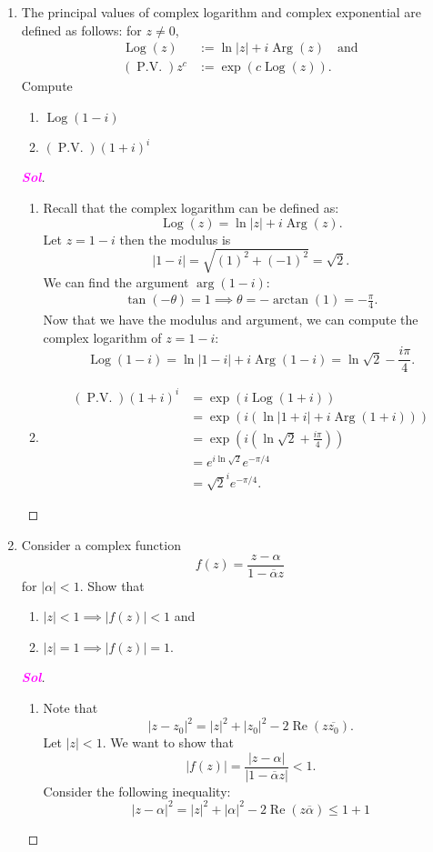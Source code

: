 \documentclass{article}
\theoremstyle{definition}
\newcommand{\Log}{\operatorname{Log}}
\newcommand{\Arg}{\operatorname{Arg}}
\newcommand{\pv}{\operatorname{P.V.}}
\newcommand{\of}[1]{\left( #1 \right)}
\newcommand{\abs}[1]{\left\lvert #1 \right\rvert}
\newcommand{\sol}{\textcolor{magenta}{\bf Sol}}
\newcommand{\conjugate}[1]{\overline{#1}}
\renewcommand{\Re}{\operatorname{Re}}
\begin{document}
\begin{enumerate}
		\item The principal values of complex logarithm and complex exponential are defined as follows: for $z\neq 0$,
		\begin{align*}
		\Log\of{z} &:=\ln\abs{z}+i\Arg\of{z}\quad\text{and}\\
		\of{\pv}z^c &:=\exp\of{c\Log\of{z}}.
		\end{align*} Compute \begin{enumerate}
			\item $\Log\of{1-i}$ 
			\item $\of{\pv}\of{1+i}^i$
		\end{enumerate}
		\begin{proof}[\sol]
			\begin{enumerate}
				\item Recall that the complex logarithm can be defined as:
				\[\Log(z) = \ln|z| + i\Arg(z).
				\]
				Let $z = 1-i$ then the modulus is
				\[|1-i| = \sqrt{(1)^2 + (-1)^2} = \sqrt{2}.\]
				We can find the argument $\arg(1-i)$: \begin{align*}
				\tan(-\theta)=1\implies\theta=-\arctan\of{1}=-\frac{\pi}{4}.
				\end{align*}
				Now that we have the modulus and argument, we can compute the complex logarithm of $z = 1 - i$:
				\[
				\Log(1-i) = \ln|1-i| + i\Arg(1-i) = \ln\sqrt{2} - \frac{i\pi}{4}.
				\]
				
				\item \begin{align*}
				\of{\pv}\of{1+i}^i &=\exp\of{i\Log\of{1+i}}\\
				&=\exp\of{i\of{\ln\abs{1+i}+i\Arg\of{1+i}}}\\
				&=\exp\of{i\of{\ln\sqrt{2}+\frac{i\pi}{4}}}\\
				&=e^{i\ln\sqrt{2}}e^{-\pi/4}\\
				&=\sqrt{2}^ie^{-\pi/4}.
				\end{align*}
			\end{enumerate}
		\end{proof}
		
		\item Consider a complex function \[
		f\of{z}=\frac{z-\alpha}{1-\conjugate{\alpha}z}
		\] for $\abs{\alpha}<1$. Show that \begin{enumerate}
			\item $\abs{z}<1\implies\abs{f\of{z}}<1$ and
			\item $\abs{z}=1\implies\abs{f\of{z}}=1$.
		\end{enumerate}
		\begin{proof}[\sol]
			\begin{enumerate}
				\item Note that \[
				\abs{z-z_0}^2=\abs{z}^2+\abs{z_0}^2-2\Re\of{z\conjugate{z_0}}.
				\] Let $\abs{z}<1$. We want to show that \[
				\abs{f\of{z}}=\frac{\abs{z-\alpha}}{\abs{1-\conjugate{\alpha}z}}<1.
				\] Consider the following inequality: \[
				\abs{z-\alpha}^2=\abs{z}^2+\abs{\alpha}^2-2\Re\of{z\conjugate{\alpha}}\leq 1+1
				\]
			\end{enumerate}
		\end{proof}
	

\end{enumerate}
\end{document}
